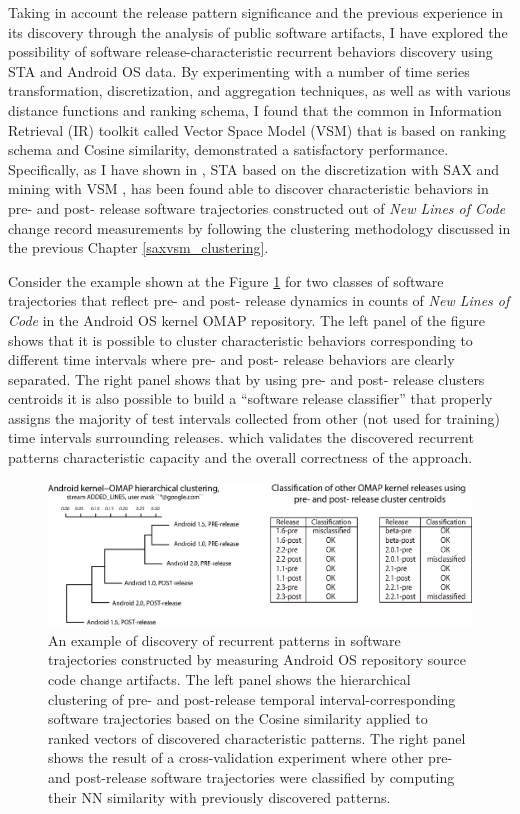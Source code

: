 Taking in account the release pattern significance and the previous experience in its discovery through the analysis of 
public software artifacts, I have explored the possibility of software release-characteristic recurrent behaviors discovery using 
STA and Android OS data.
By experimenting with a number of time series transformation, discretization, and aggregation techniques, as well as with various 
distance functions and ranking schema, I found that the common in Information Retrieval (IR) toolkit called Vector Space Model 
(VSM) \cite{citeulike:300428} that is based on \tfidf ranking schema and Cosine similarity, demonstrated a satisfactory performance. 
Specifically, as I have shown in \cite{csdl2-11-10}, STA based on the discretization with SAX \cite{sax} and mining with VSM 
\cite{citeulike:300428}, has been found able to discover characteristic behaviors in pre- and post- release software trajectories 
constructed out of \textit{New Lines of Code} change record measurements by following the clustering methodology discussed
in the previous Chapter \ref{saxvsm_clustering}. 

Consider the example shown at the Figure \ref{fig:STA2-results} for two classes of software trajectories that reflect pre- and post- 
release dynamics in counts of \textit{New Lines of Code} in the Android OS kernel OMAP repository. 
The left panel of the figure shows that it is possible to cluster characteristic behaviors corresponding to different time intervals 
where pre- and post- release behaviors are clearly separated. 
The right panel shows that by using pre- and post- release clusters centroids it is also possible to build a ``software release classifier''
that properly assigns the majority of test intervals collected from other (not used for training) time intervals surrounding releases. 
which validates the discovered recurrent patterns characteristic capacity and the overall correctness of the approach.

\begin{figure}[t]
   \centering
   \includegraphics[width=145mm]{figures/STA2.eps}
   \caption{An example of discovery of recurrent patterns in software trajectories constructed by measuring Android OS 
   repository source code change artifacts.
   The left panel shows the hierarchical clustering of pre- and post-release temporal interval-corresponding software 
   trajectories based on the Cosine similarity applied to ranked vectors of discovered characteristic patterns.
   The right panel shows the result of a cross-validation experiment where other pre- and post-release software trajectories 
   were classified by computing their NN similarity with previously discovered patterns.}
   \label{fig:STA2-results}
\end{figure}

